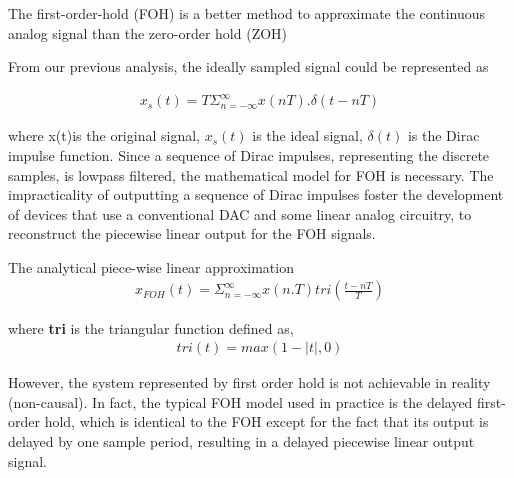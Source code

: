 \documentclass{article}
\begin{document}
The first-order-hold (FOH)
is a better method to approximate the continuous analog signal than the zero-order hold
(ZOH)

From our previous analysis, the ideally sampled signal could be represented as

\begin{equation}
\begin{aligned}
    x_s(t) = T \Sigma_{n = -\infty}^{\infty} x(nT).\delta(t-nT)
\end{aligned}
\end{equation}

where x(t)is the original signal, $ x_s(t) $ is the ideal signal, $ \delta(t) $ is the Dirac impulse
function. Since a sequence of Dirac impulses, representing the discrete samples, is lowpass filtered, the mathematical model for FOH is necessary. The impracticality of
outputting a sequence of Dirac impulses foster the development of devices that use a
conventional DAC and some linear analog circuitry, to reconstruct the piecewise linear
output for the FOH signals.

The analytical piece-wise linear approximation 
\begin{equation}
\begin{aligned}
    x_{FOH}(t) = \Sigma_{n = -\infty}^{\infty} x(n.T) tri(\frac{t-nT}{T})
\end{aligned}
\end{equation}

where \textbf{tri} is the triangular function defined as, 
\begin{equation}
\begin{aligned}
    tri(t) = max(1-|t|, 0)
\end{aligned}
\end{equation}

However, the system represented by first order hold is not achievable in reality (non-causal). In fact, the typical FOH model used in practice is the delayed first-order hold, which is identical to the FOH except for the fact that its output is delayed by one sample period, resulting in a delayed piecewise linear output signal. 
\end{document}
